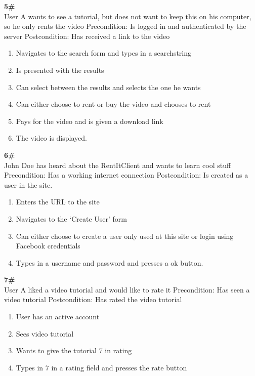 	
\vspace{10pt}
\textbf{5\# }\\
User A wants to see a tutorial, but does not want to keep this on his computer, so he only rents the video
Precondition: Is logged in and authenticated by the server
Postcondition: Has received a link to the video
\begin{enumerate}
\item Navigates to the search form and types in a searchstring
\item Is presented with the results
\item Can select between the results and selects the one he wants
\item Can either choose to rent or buy the video and chooses to rent
\item Pays for the video and is given a download link
\item The video is displayed.
\end{enumerate}
	
\vspace{10pt}
\textbf{6\#}\\
John Doe has heard about the RentItClient and wants to learn cool stuff
Precondition: Has a working internet connection
Postcondition: Is created as a user in the site.
\begin{enumerate}
\item Enters the URL to the site
\item Navigates to the ‘Create User’ form
\item Can either choose to create a user only used at this site or login using Facebook credentials
\item Types in a username and password and presses a ok button. 
\end{enumerate}

\vspace{10pt}
\textbf{7\#}\\
User A liked a video tutorial and would like to rate it
Precondition: Has seen a video tutorial
Postcondition: Has rated the video tutorial
\begin{enumerate}
\item User has an active account
\item Sees video tutorial
\item Wants to give the tutorial 7 in rating
\item Types in 7 in a rating field and presses the rate button
\end{enumerate}


